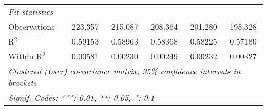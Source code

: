 \begin{table}[htbp]
\begin{threeparttable}[b]
\begin{tabular}{lccccc}
         \midrule
         \emph{Fit statistics}\\
         Observations               & 223,357          & 215,087          & 208,364          & 201,280          & 195,328\\  
         R$^2$                      & 0.59153          & 0.58963          & 0.58368          & 0.58225          & 0.57180\\  
         Within R$^2$               & 0.00581          & 0.00230          & 0.00249          & 0.00232          & 0.00327\\  
         \midrule \midrule
         \multicolumn{6}{l}{\emph{Clustered (User) co-variance matrix, 95\% confidence intervals in brackets}}\\
         \multicolumn{6}{l}{\emph{Signif. Codes: ***: 0.01, **: 0.05, *: 0.1}}\\
      \end{tabular}
   \end{threeparttable}
\end{table}


